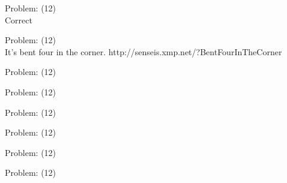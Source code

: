 \documentclass[11pt]{article}
\begin{document}
\begin{minipage}[t]{0.5\textwidth}
  {\centering
  
  Problem: (12)\\
  Correct\\
  }
\end{minipage}
\begin{minipage}[t]{0.5\textwidth}
  {\centering
  
  Problem: (12)\\
  It's bent four in the corner. http://senseis.xmp.net/?BentFourInTheCorner\\
  }
\end{minipage}
\begin{minipage}[t]{0.5\textwidth}
  {\centering
  
  Problem: (12)\\
  
  }
\end{minipage}
\begin{minipage}[t]{0.5\textwidth}
  {\centering
  
  Problem: (12)\\
  
  }
\end{minipage}
\begin{minipage}[t]{0.5\textwidth}
  {\centering
  
  Problem: (12)\\
  
  }
\end{minipage}
\begin{minipage}[t]{0.5\textwidth}
  {\centering
  
  Problem: (12)\\
  
  }
\end{minipage}
\begin{minipage}[t]{0.5\textwidth}
  {\centering
  
  Problem: (12)\\
  
  }
\end{minipage}
\begin{minipage}[t]{0.5\textwidth}
  {\centering
  
  Problem: (12)\\
  
  }
\end{minipage}
\end{document}
